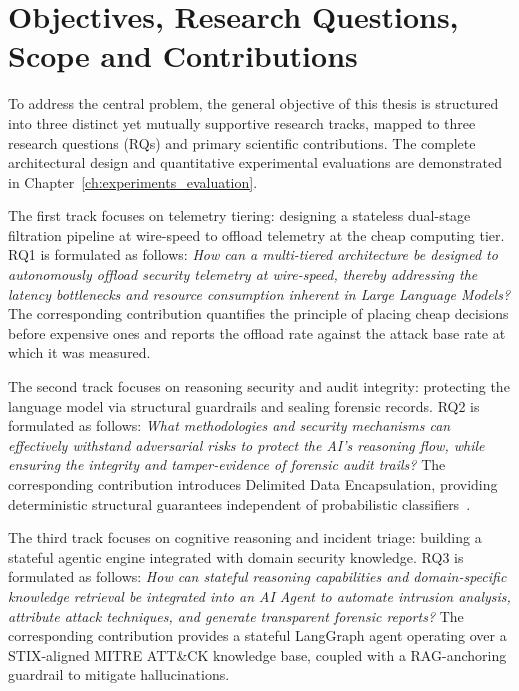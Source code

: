 \section{Objectives, Research Questions, Scope and Contributions}
\label{sec:rq}

To address the central problem, the general objective of this thesis is structured into three distinct yet mutually supportive research tracks, mapped to three research questions (RQs) and primary scientific contributions. The complete architectural design and quantitative experimental evaluations are demonstrated in Chapter~\ref{ch:experiments_evaluation}.

The first track focuses on telemetry tiering: designing a stateless dual-stage filtration pipeline at wire-speed to offload telemetry at the cheap computing tier. RQ1 is formulated as follows: \textit{How can a multi-tiered architecture be designed to autonomously offload security telemetry at wire-speed, thereby addressing the latency bottlenecks and resource consumption inherent in Large Language Models?} The corresponding contribution quantifies the principle of placing cheap decisions before expensive ones and reports the offload rate against the attack base rate at which it was measured.

The second track focuses on reasoning security and audit integrity: protecting the language model via structural guardrails and sealing forensic records. RQ2 is formulated as follows: \textit{What methodologies and security mechanisms can effectively withstand adversarial risks to protect the AI's reasoning flow, while ensuring the integrity and tamper-evidence of forensic audit trails?} The corresponding contribution introduces Delimited Data Encapsulation, providing deterministic structural guarantees independent of probabilistic classifiers~\cite{owasp_llm2025}.

The third track focuses on cognitive reasoning and incident triage: building a stateful agentic engine integrated with domain security knowledge. RQ3 is formulated as follows: \textit{How can stateful reasoning capabilities and domain-specific knowledge retrieval be integrated into an AI Agent to automate intrusion analysis, attribute attack techniques, and generate transparent forensic reports?} The corresponding contribution provides a stateful LangGraph agent operating over a STIX-aligned MITRE ATT\&CK knowledge base, coupled with a RAG-anchoring guardrail to mitigate hallucinations.

